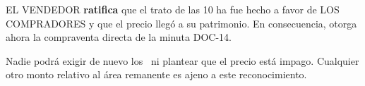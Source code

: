 \documentclass[12pt,a4paper]{article}
\begin{document}
EL VENDEDOR \textbf{ratifica} que el trato de las 10 ha fue hecho a favor de LOS COMPRADORES y que el precio llegó a su patrimonio. En consecuencia, otorga ahora la compraventa directa de la minuta DOC-14.

Nadie podrá exigir de nuevo los \MontoPago\ ni plantear que el precio está impago. Cualquier otro monto relativo al área remanente es ajeno a este reconocimiento.

\LugarFecha
{}

\vspace{0.8em}
\\
\noindent{}
\end{document}
